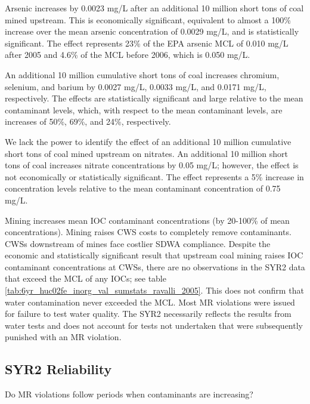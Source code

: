 \documentclass{article}
\begin{document}
Arsenic increases by 0.0023 mg/L after an additional 10 million short tons of coal mined upstream. This is economically significant, equivalent to almost a 100\% increase over the mean arsenic concentration of 0.0029 mg/L, and is statistically significant. The effect represents 23\% of the EPA arsenic MCL of 0.010 mg/L after 2005 and 4.6\% of the MCL before 2006, which is 0.050 mg/L.

An additional 10 million cumulative short tons of coal increases chromium, selenium, and barium by 0.0027 mg/L, 0.0033 mg/L, and 0.0171 mg/L, respectively. The effects are statistically significant and large relative to the mean contaminant levels, which, with respect to the mean contaminant levels, are increases of 50\%, 69\%, and 24\%, respectively.

We lack the power to identify the effect of an additional 10 million cumulative short tons of coal mined upstream on nitrates. An additional 10 million short tons of coal increases nitrate concentrations by 0.05 mg/L; however, the effect is not economically or statistically significant. The effect represents a 5\% increase in concentration levels relative to the mean contaminant concentration of 0.75 mg/L.

Mining increases mean IOC contaminant concentrations (by 20-100\%
of mean concentrations). Mining raises CWS costs to completely remove contaminants. CWSs downstream of mines face costlier SDWA compliance. Despite the economic and statistically significant result that upstream coal mining raises IOC contaminant concentrations at CWSs, there are no observations in the SYR2 data that exceed the MCL of any IOCs; see table \ref{tab:6yr_huc02fe_inorg_val_sumstats_ravalli_2005}. This does not confirm that water contamination never exceeded the MCL. Most MR violations were issued for failure to test water quality. The SYR2 necessarily reflects the results from water tests and does not account for tests not undertaken that were subsequently punished with an MR violation.

\subsection{SYR2 Reliability}

Do MR violations follow periods when contaminants are increasing?


\end{document}
